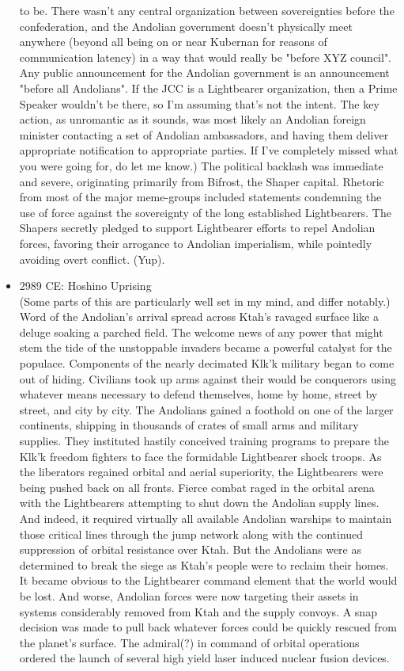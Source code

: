 \begin{itemize}
to be. There wasn't any central organization between sovereignties
before the confederation, and the Andolian government doesn't
physically meet anywhere (beyond all being on or near Kubernan for
reasons of communication latency) in a way that would really be 
"before XYZ council". Any public announcement for the Andolian
government is an announcement "before all Andolians".  If the JCC is
a Lightbearer organization, then a Prime Speaker wouldn't be there,
so I'm assuming that's not the intent. The key action, as unromantic
as it sounds, was most likely an Andolian foreign minister contacting
a set of Andolian ambassadors, and having them deliver appropriate
notification to appropriate parties. If I've completely missed what
you were going for, do let me know.)  The political backlash was
immediate and severe, originating primarily from Bifrost, the Shaper
capital.  Rhetoric from most of the major meme-groups included
statements condemning the use of force against the sovereignty of the
long established Lightbearers.  The Shapers secretly pledged to
support Lightbearer efforts to repel Andolian forces, favoring their
arrogance to Andolian imperialism, while pointedly avoiding overt
conflict. (Yup).

\item 2989 CE: Hoshino Uprising \\

(Some parts of this are particularly well set in my mind, and differ
notably.)  Word of the Andolian's arrival spread across Ktah's ravaged
surface like a deluge soaking a parched field.  The welcome news of
any power that might stem the tide of the unstoppable invaders became
a powerful catalyst for the populace.  Components of the nearly
decimated Klk'k military began to come out of hiding.  Civilians took
up arms against their would be conquerors using whatever means
necessary to defend themselves, home by home, street by street, and
city by city.  The Andolians gained a foothold on one of the larger
continents, shipping in thousands of crates of small arms and military
supplies.  They instituted hastily conceived training programs to
prepare the Klk'k freedom fighters to face the formidable Lightbearer
shock troops.  As the liberators regained orbital and aerial
superiority, the Lightbearers were being pushed back on all fronts.
Fierce combat raged in the orbital arena with the Lightbearers
attempting to shut down the Andolian supply lines.  And indeed, it
required virtually all available Andolian warships to maintain those
critical lines through the jump network along with the continued
suppression of orbital resistance over Ktah.  But the Andolians were
as determined to break the siege as Ktah's people were to reclaim
their homes.  It became obvious to the Lightbearer command element
that the world would be lost.  And worse, Andolian forces were now
targeting their assets in systems considerably removed from Ktah and
the supply convoys.  A snap decision was made to pull back whatever
forces could be quickly rescued from the planet's surface.  The
admiral(?) in command of orbital operations ordered the launch of
several high yield laser induced nuclear fusion devices.


\end{itemize}
